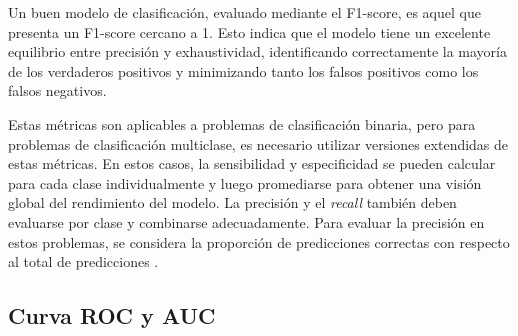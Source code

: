 Un buen modelo de clasificación, evaluado mediante el F1-score, es aquel que presenta un F1-score cercano a 1. Esto indica que el modelo tiene un excelente equilibrio entre precisión y exhaustividad, identificando correctamente la mayoría de los verdaderos positivos y minimizando tanto los falsos positivos como los falsos negativos. 


Estas métricas son aplicables a problemas de clasificación binaria, pero para problemas de clasificación multiclase, es necesario utilizar versiones extendidas de estas métricas. En estos casos, la sensibilidad y especificidad se pueden calcular para cada clase individualmente y luego promediarse para obtener una visión global del rendimiento del modelo. La precisión y el \textit{recall} también deben evaluarse por clase y combinarse adecuadamente. Para evaluar la precisión en estos problemas, se considera la proporción de predicciones correctas con respecto al total de predicciones \citep{zhang2013review}.

\subsection{Curva ROC y AUC}

